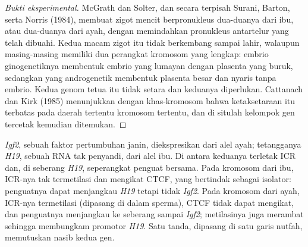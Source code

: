 \begin{proof}[Bukti eksperimental]
McGrath dan Solter, dan secara terpisah Surani, Barton, serta Norris (1984),
membuat zigot mencit berpronukleus dua-duanya dari ibu, atau dua-duanya dari
ayah, dengan memindahkan pronukleus antartelur yang telah dibuahi. Kedua
macam zigot itu tidak berkembang sampai lahir, walaupun masing-masing
memiliki dua perangkat kromosom yang lengkap: embrio ginogenetiknya membentuk
embrio yang lumayan dengan plasenta yang buruk, sedangkan yang androgenetik
membentuk plasenta besar dan nyaris tanpa embrio. Kedua genom tetua itu tidak
setara dan keduanya diperlukan. Cattanach dan Kirk (1985) menunjukkan dengan
 khas-kromosom bahwa ketaksetaraan itu terbatas pada daerah
tertentu kromosom tertentu, dan di situlah kelompok gen tercetak kemudian
ditemukan.
\end{proof}

\begin{example}\label{ex:b3:chromatin-epigenetics:igf2}
\emph{Igf2}, sebuah faktor pertumbuhan janin, diekspresikan dari alel ayah;
tetangganya \emph{H19}, sebuah RNA tak penyandi, dari alel ibu. Di antara
keduanya terletak ICR dan, di seberang \emph{H19}, seperangkat penguat
bersama. Pada kromosom dari ibu, ICR-nya tak termetilasi dan mengikat CTCF,
yang bertindak sebagai isolator: penguatnya dapat menjangkau \emph{H19}
tetapi tidak \emph{Igf2}. Pada kromosom dari ayah, ICR-nya termetilasi
(dipasang di dalam sperma), CTCF tidak dapat mengikat, dan penguatnya
menjangkau ke seberang sampai \emph{Igf2}; metilasinya juga merambat sehingga
membungkam promotor \emph{H19}. Satu tanda, dipasang di satu garis nutfah,
memutuskan nasib kedua gen.
\end{example}

